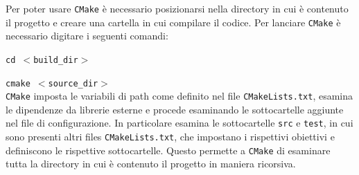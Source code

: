 

Per poter usare \texttt{CMake} è necessario posizionarsi nella directory in cui è contenuto il progetto e creare una cartella in cui compilare il codice. Per lanciare \texttt{CMake} è necessario digitare i seguenti comandi: \\ 

\par  \texttt{cd $<$build\_dir$>$ } 
\par \texttt{cmake $<$source\_dir$>$}\\

\noindent \texttt{CMake} imposta le variabili di path come definito nel file  \texttt{CMakeLists.txt}, esamina le dipendenze da librerie esterne e procede esaminando le sottocartelle aggiunte nel file di configurazione. In particolare esamina le sottocartelle \texttt{src} e \texttt{test}, in cui sono presenti altri files  \texttt{CMakeLists.txt}, che impostano i rispettivi obiettivi e definiscono le rispettive sottocartelle. Questo permette a \texttt{CMake} di esaminare tutta la directory in cui è contenuto il progetto in maniera ricorsiva. \\

